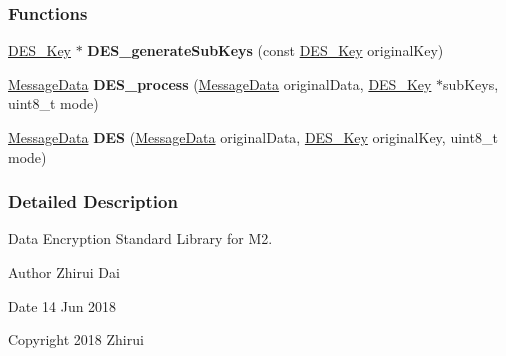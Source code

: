 \subsubsection*{Functions}
\begin{DoxyCompactItemize}
\item 
\mbox{\label{a00005_a3ef9fea40f3c593468a2bb7862abfa0d}} 
\mbox{\hyperlink{a00134}{D\+E\+S\+\_\+\+Key}} $\ast$ {\bfseries D\+E\+S\+\_\+generate\+Sub\+Keys} (const \mbox{\hyperlink{a00134}{D\+E\+S\+\_\+\+Key}} original\+Key)
\item 
\mbox{\label{a00005_a0c6c5c79645bfd3166aeb494b41a82f8}} 
\mbox{\hyperlink{a00138}{Message\+Data}} {\bfseries D\+E\+S\+\_\+process} (\mbox{\hyperlink{a00138}{Message\+Data}} original\+Data, \mbox{\hyperlink{a00134}{D\+E\+S\+\_\+\+Key}} $\ast$sub\+Keys, uint8\+\_\+t mode)
\item 
\mbox{\label{a00005_a26f09735ce4f946320fee32bfa4a5ef5}} 
\mbox{\hyperlink{a00138}{Message\+Data}} {\bfseries D\+ES} (\mbox{\hyperlink{a00138}{Message\+Data}} original\+Data, \mbox{\hyperlink{a00134}{D\+E\+S\+\_\+\+Key}} original\+Key, uint8\+\_\+t mode)
\end{DoxyCompactItemize}


\subsubsection{Detailed Description}
Data Encryption Standard Library for M2. 

\begin{DoxyAuthor}{Author}
Zhirui Dai 
\end{DoxyAuthor}
\begin{DoxyDate}{Date}
14 Jun 2018 
\end{DoxyDate}
\begin{DoxyCopyright}{Copyright}
2018 Zhirui 
\end{DoxyCopyright}

